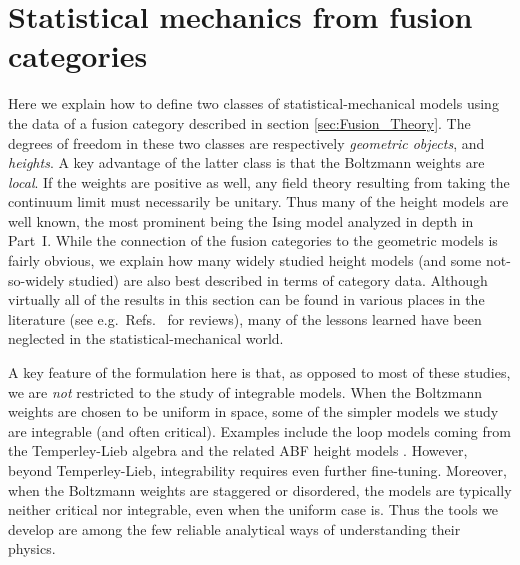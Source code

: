

\section{Statistical mechanics from fusion categories}
\label{sec:statmech}

Here we explain how to define two classes of statistical-mechanical models using the data of a fusion category described in section \ref{sec:Fusion_Theory}. The degrees of freedom in these two classes are respectively {\em geometric objects}, and {\em heights}. 
A key advantage of the latter class is that the Boltzmann weights are {\em local}. If the weights are positive as well, any field theory resulting from taking the continuum limit must necessarily be unitary. Thus many of the height models are well known, the most prominent being the Ising model analyzed in depth in Part~I.
While the connection of the fusion categories to the geometric models is fairly obvious, we explain how many widely studied height models (and some not-so-widely studied) are also best described in terms of category data.
Although virtually all of the results in this section can be found in various places in the literature (see e.g.\ Refs.~\cite{Wadati1989,Wu1992} for reviews), many of the lessons learned have been neglected in the statistical-mechanical world.


A key feature of the formulation here is that, as opposed to most of these studies, we are \emph{not} restricted to the study of integrable models.
When the Boltzmann weights are chosen to be uniform in space, some of the simpler models we study are integrable (and often critical).
Examples include the loop models \cite{Baxter1976,Nienhuis1990} coming from the Temperley-Lieb algebra \cite{Temperley1971} and the related ABF height models \cite{Andrews1984}.
However, beyond Temperley-Lieb, integrability requires even further fine-tuning.
Moreover, when the Boltzmann weights are staggered or disordered, the models are typically neither critical nor integrable, even when the uniform case is. 
Thus the tools we develop are among the few reliable analytical ways of understanding their physics. 




